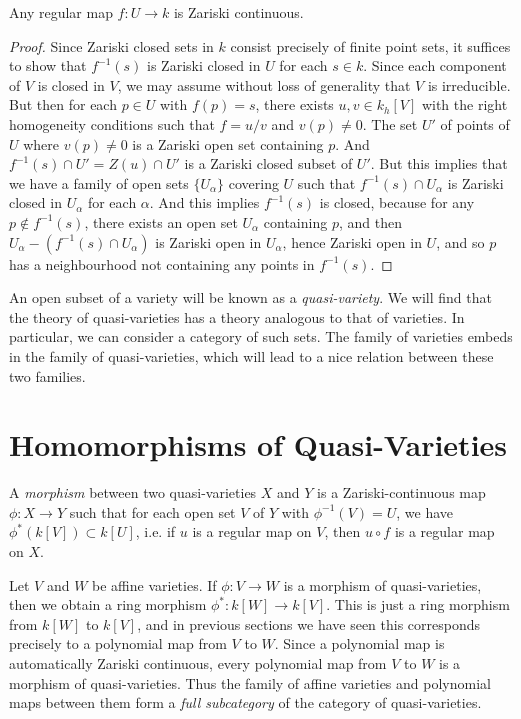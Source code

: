 \begin{theorem}
    Any regular map $f: U \to k$ is Zariski continuous.
\end{theorem}
\begin{proof}
    Since Zariski closed sets in $k$ consist precisely of finite point sets, it suffices to show that $f^{-1}(s)$ is Zariski closed in $U$ for each $s \in k$. Since each component of $V$ is closed in $V$, we may assume without loss of generality that $V$ is irreducible. But then for each $p \in U$ with $f(p) = s$, there exists $u,v \in k_h[V]$ with the right homogeneity conditions such that $f = u/v$ and $v(p) \neq 0$. The set $U'$ of points of $U$ where $v(p) \neq 0$ is a Zariski open set containing $p$. And $f^{-1}(s) \cap U' = Z(u) \cap U'$ is a Zariski closed subset of $U'$. But this implies that we have a family of open sets $\{ U_\alpha \}$ covering $U$ such that $f^{-1}(s) \cap U_\alpha$ is Zariski closed in $U_\alpha$ for each $\alpha$. And this implies $f^{-1}(s)$ is closed, because for any $p \not \in f^{-1}(s)$, there exists an open set $U_\alpha$ containing $p$, and then $U_\alpha - (f^{-1}(s) \cap U_\alpha)$ is Zariski open in $U_\alpha$, hence Zariski open in $U$, and so $p$ has a neighbourhood not containing any points in $f^{-1}(s)$.
\end{proof}

An open subset of a variety will be known as a \emph{quasi-variety}. We will find that the theory of quasi-varieties has a theory analogous to that of varieties. In particular, we can consider a category of such sets. The family of varieties embeds in the family of quasi-varieties, which will lead to a nice relation between these two families.

\section{Homomorphisms of Quasi-Varieties}

A \emph{morphism} between two quasi-varieties $X$ and $Y$ is a Zariski-continuous map $\phi: X \to Y$ such that for each open set $V$ of $Y$ with $\phi^{-1}(V) = U$, we have $\phi^*(k[V]) \subset k[U]$, i.e. if $u$ is a regular map on $V$, then $u \circ f$ is a regular map on $X$.

\begin{example}
    Let $V$ and $W$ be affine varieties. If $\phi: V \to W$ is a morphism of quasi-varieties, then we obtain a ring morphism $\phi^*: k[W] \to k[V]$. This is just a ring morphism from $k[W]$ to $k[V]$, and in previous sections we have seen this corresponds precisely to a polynomial map from $V$ to $W$. Since a polynomial map is automatically Zariski continuous, every polynomial map from $V$ to $W$ is a morphism of quasi-varieties. Thus the family of affine varieties and polynomial maps between them form a \emph{full subcategory} of the category of quasi-varieties.
\end{example}

